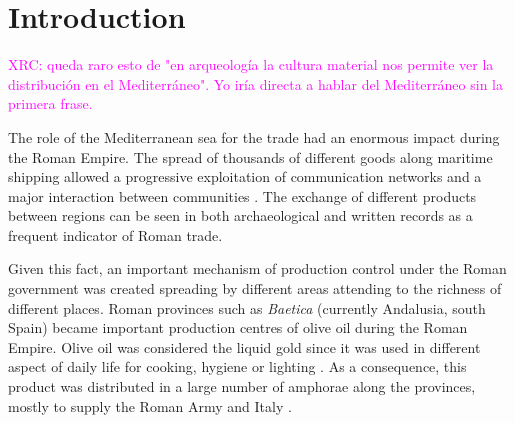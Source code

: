 \documentclass[review]{elsarticle}
\newcommand{\memo}[2]{\textcolor{#1}{#2}}
\newcommand{\xavi}[1]{\memo{magenta}{XRC: #1\\}}
\begin{document}
\section{Introduction}


\xavi{queda raro esto de "en arqueología la cultura material nos permite ver la distribución en el Mediterráneo". Yo iría directa a hablar del Mediterráneo sin la primera frase.}


The role of the Mediterranean sea for the trade had an enormous impact during the Roman Empire. The spread of thousands of different goods along maritime shipping allowed a progressive exploitation of communication networks and a major interaction between communities \citep{rodriguez_baetican_1998, 
temin_market_2001,
bevan_mediterranean_2014}. The exchange of different products between regions can be seen in both archaeological and written records as a frequent indicator of Roman trade.  




Given this fact, an important mechanism of production control under the Roman government was created spreading by different areas attending to the richness of different places. Roman provinces such as \textit{Baetica} (currently Andalusia, south Spain) became important production centres of olive oil during the Roman Empire. Olive oil was considered the liquid gold since it was used in different aspect of daily life for cooking, hygiene or lighting  \citep{mattingly_d.j._oil_1988}. As a consequence, this product was distributed in a large number of amphorae along the provinces, mostly to supply the Roman Army and Italy \citep{blazquez_exportacion_1980}. 
\end{document}
